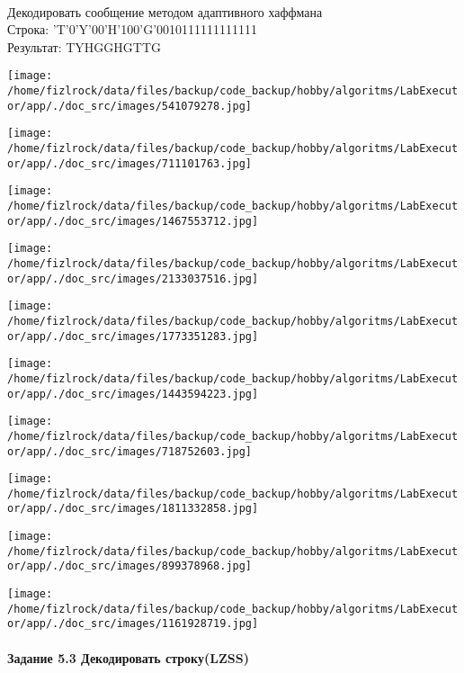 \documentclass[a4paper, 12pt]{article}
\begin{document}
\\ 

Декодировать сообщение методом адаптивного хаффмана \\
Строка: 
'T'0'Y'00'H'100'G'0010111111111111\\
Результат: TYHGGHGTTG

\texttt{[image: /home/fizlrock/data/files/backup/code\_backup/hobby/algoritms/LabExecutor/app/./doc\_src/images/541079278.jpg]}

\texttt{[image: /home/fizlrock/data/files/backup/code\_backup/hobby/algoritms/LabExecutor/app/./doc\_src/images/711101763.jpg]}

\texttt{[image: /home/fizlrock/data/files/backup/code\_backup/hobby/algoritms/LabExecutor/app/./doc\_src/images/1467553712.jpg]}

\texttt{[image: /home/fizlrock/data/files/backup/code\_backup/hobby/algoritms/LabExecutor/app/./doc\_src/images/2133037516.jpg]}

\texttt{[image: /home/fizlrock/data/files/backup/code\_backup/hobby/algoritms/LabExecutor/app/./doc\_src/images/1773351283.jpg]}

\texttt{[image: /home/fizlrock/data/files/backup/code\_backup/hobby/algoritms/LabExecutor/app/./doc\_src/images/1443594223.jpg]}

\texttt{[image: /home/fizlrock/data/files/backup/code\_backup/hobby/algoritms/LabExecutor/app/./doc\_src/images/718752603.jpg]}

\texttt{[image: /home/fizlrock/data/files/backup/code\_backup/hobby/algoritms/LabExecutor/app/./doc\_src/images/1811332858.jpg]}

\texttt{[image: /home/fizlrock/data/files/backup/code\_backup/hobby/algoritms/LabExecutor/app/./doc\_src/images/899378968.jpg]}

\texttt{[image: /home/fizlrock/data/files/backup/code\_backup/hobby/algoritms/LabExecutor/app/./doc\_src/images/1161928719.jpg]}
\pagebreak
\paragraph{Задание 5.3 Декодировать строку(LZSS)\\}
\end{document}

